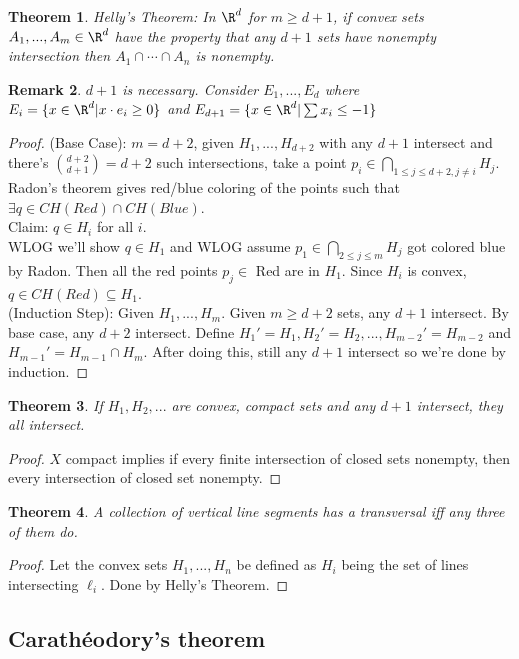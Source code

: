 \documentclass[a4paper]{article}
\newtheorem{thm}{Theorem}[section]
\newtheorem{rmk}[thm]{Remark}
\begin{document}
\begin{thm}
    Helly's Theorem: In $\R^d$ for $m\geq d+1$, if convex sets $A_1,...,A_m\in \R^d$ have the property that any $d+1$ sets have nonempty intersection then $A_1\cap \cdots \cap A_n$ is nonempty. 
\end{thm}
\begin{rmk}
    $d+1$ is necessary. Consider $E_1,...,E_d$ where $E_i= \{x\in \R^d|x\cdot e_i\geq 0\}$ and $E_{d+1}= \{x\in \R^d|\sum x_i\leq -1\}$
\end{rmk}
\begin{proof}
    (Base Case): $m=d+2$, given $H_1,...,H_{d+2}$ with any $d+1$ intersect and there's ${d+2 \choose d+1}=d+2$ such intersections, take a point $p_i\in \bigcap_{1\leq j \leq d+2, j\neq i}H_j$. Radon's theorem gives red/blue coloring of the points such that $\exists q\in CH(Red)\cap CH(Blue)$. \\
    Claim: $q\in H_i$ for all $i$. \\
    WLOG we'll show $q\in H_1$ and WLOG assume $p_1\in \bigcap_{2\leq j\leq m}H_j$ got colored blue by Radon. Then all the red points $p_j\in $ Red are in $H_1$. Since $H_i$ is convex, $q\in CH(Red)\subseteq H_1$.\\
    (Induction Step): Given $H_1,...,H_{m}$. Given $m\geq d+2$ sets, any $d+1$ intersect. By base case, any $d+2$ intersect. Define $H_1'=H_1,H_2'=H_2,...,H_{m-2}'=H_{m-2}$ and $H_{m-1}'=H_{m-1}\cap H_m$. After doing this, still any $d+1$ intersect so we're done by induction. 
\end{proof}
\begin{thm}
    If $H_1,H_2,...$ are convex, compact sets and any $d+1$ intersect, they all intersect. 
\end{thm}
\begin{proof}
    $X$ compact implies if every finite intersection of closed sets nonempty, then every intersection of closed set nonempty. 
\end{proof}
\begin{thm}
    A collection of vertical line segments has a transversal iff any three of them do. 
\end{thm}
\begin{proof}
    Let the convex sets $H_1,...,H_n$ be defined as $H_i$ being the set of lines intersecting $\ell_i$. Done by Helly's Theorem. 
\end{proof}

\subsection{Carath\'eodory's theorem}
\end{document}
